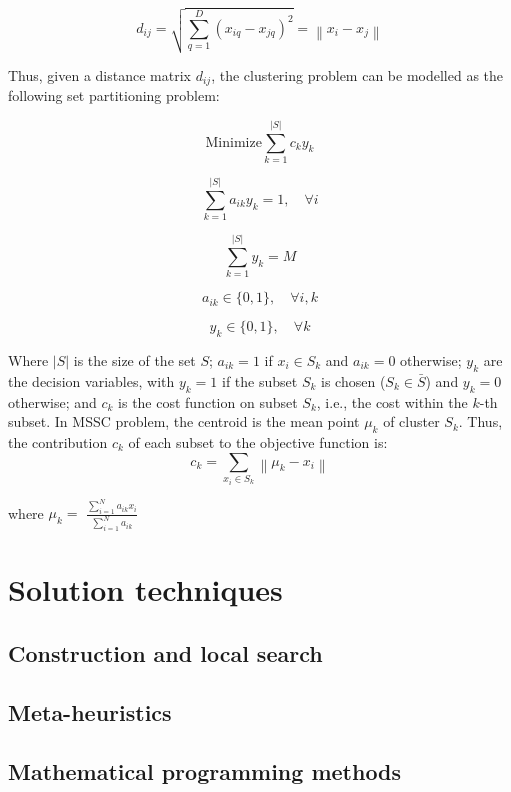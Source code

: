 \begin{equation}
d_{ij} = \sqrt{\sum_{q=1}^{D}(x_{iq} - x_{jq})^2} = \left \| x_i - x_j \right \|
\end{equation}

Thus, given a distance matrix $d_{ij}$, the clustering problem can be modelled as the following set partitioning problem:

\begin{equation} \label{eq:of}
\textrm{Minimize} \sum_{k=1}^{\left | S \right |}c_ky_k
\end{equation}


\begin{equation}
\sum_{k=1}^{\left | S \right |}a_{ik}y_k = 1, \quad \forall i
\end{equation}

\begin{equation}
\sum_{k=1}^{\left | S \right |}y_k = M
\end{equation}

\begin{equation}
a_{ik} \in \{0,1\}, \quad \forall i,k
\end{equation}

\begin{equation}
y_k \in \{0,1\}, \quad \forall k
\end{equation}

Where $\left | S \right |$ is the size of the set $S$; $a_{ik} = 1$ if $x_i \in S_k$ and $a_{ik} = 0$ otherwise; $y_k$ are the decision variables, with $y_k = 1$ if the subset $S_k$ is chosen ($S_k \in \bar{S}$) and $y_k = 0$ otherwise; and $c_k$ is the cost function on subset $S_k$, i.e., the cost within the $k$-th subset. In MSSC problem, the centroid is the mean point $\mu_k$ of cluster $S_k$. Thus, the contribution $c_k$ of each subset to the objective function is:
	\begin{equation}
	c_k = \sum_{x_i \in S_k}\left \| \mu_k - x_i \right \|
	\end{equation}
	\begin{center}
	where $\mu_k = $ \Large $\frac{\sum_{i = 1}^{N}a_{ik}x_i}{\sum_{i = 1}^{N}a_{ik}}$	
	\end{center}

\section{Solution techniques}

\subsection{Construction and local search}

\subsection{Meta-heuristics}

\subsection{Mathematical programming methods}